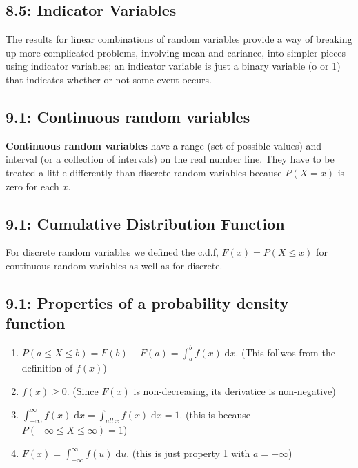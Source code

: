 \documentclass[11pt]{article}
\begin{document}
     	\subsection*{8.5: Indicator Variables}
     		The results for linear combinations of random variables provide a way of breaking up more complicated problems, involving mean and cariance, into simpler pieces using indicator variables; an indicator variable is just a binary variable (o or 1) that indicates whether or not some event occurs. 
     	\subsection*{9.1: Continuous random variables}
     		{\bf Continuous random variables} have a range (set of possible values) and interval (or a collection of intervals) on the real number line. They have to be treated a little differently than discrete random variables because $P(X=x)$ is zero for each $x$. 
     	\subsection*{9.1: Cumulative Distribution Function}
     		For discrete random variables we defined the c.d.f, $F(x) = P(X \leq x)$ for continuous random variables as well as for discrete.
     		
     	\subsection*{9.1: Properties of a probability density function}
     		\begin{enumerate}
     			\item $P(a \leq X \leq b) = F(b)-F(a)= \int_a^b \! f(x)\; \mathrm{d}x$. (This follwos from the definition of $f(x)$)
     			
     			\item $f(x) \geq 0$. (Since $F(x)$ is non-decreasing, its derivatice is non-negative)
     			
     			\item $\int_{-\infty}^{\infty} \!f(x) \; \mathrm{d}x=\int_{all\;x} \! f(x) \; \mathrm{d}x = 1$. (this is because $P(-\infty \leq X\leq \infty)=1$)
     			
     			\item $F(x) = \int_{-\infty}^{\infty} \! f(u) \; \mathrm{d}u$. (this is just property 1 with $a=-\infty$)
     		\end{enumerate}
\end{document}
